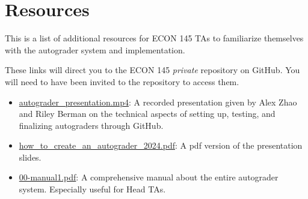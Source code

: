 \documentclass[
  12pt,
]{book}
\begin{document}
\chapter{Resources}\label{Resources}

This is a list of additional resources for ECON 145 TAs to familiarize themselves with the autograder system and implementation.

These links will direct you to the ECON 145 \emph{private} repository on GitHub. You will need to have been invited to the repository to access them.

\begin{itemize}
\item
  \href{https://github.com/datawranglingUCSBecon/econ_145/blob/master/manuals/autograder_quickstart_ta/autograder_presentation.mp4}{autograder\_presentation.mp4}: A recorded presentation given by Alex Zhao and Riley Berman on the technical aspects of setting up, testing, and finalizing autograders through GitHub.
\item
  \href{https://github.com/datawranglingUCSBecon/econ_145/blob/master/manuals/autograder_quickstart_ta/how_to_create_an_autograder_2024.pdf}{how\_to\_create\_an\_autograder\_2024.pdf}: A pdf version of the presentation slides.
\item
  \href{https://github.com/datawranglingUCSBecon/econ_145/blob/master/manuals/autograder_ta/00-manual1.pdf}{00-manual1.pdf}: A comprehensive manual about the entire autograder system. Especially useful for Head TAs.
\end{itemize}

  
\end{document}
